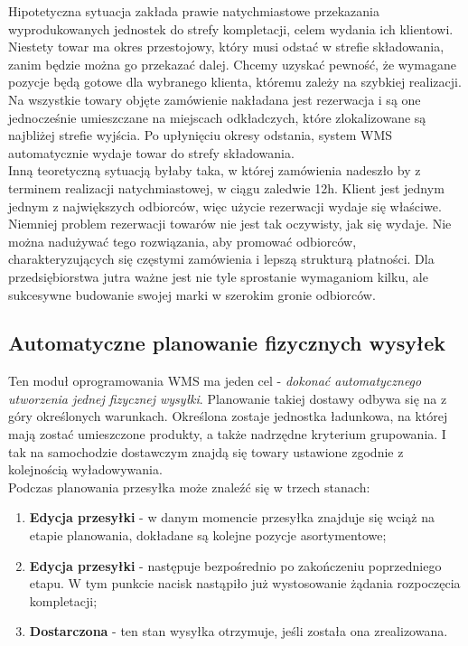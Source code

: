 		Hipotetyczna sytuacja zakłada prawie natychmiastowe przekazania wyprodukowanych jednostek do strefy kompletacji,
		celem wydania ich klientowi. Niestety towar ma okres przestojowy, który musi odstać w strefie składowania, 
		zanim będzie można go przekazać dalej. Chcemy uzyskać pewność, że wymagane pozycje będą gotowe
		dla wybranego klienta, któremu zależy na szybkiej realizacji. Na wszystkie towary objęte zamówienie nakładana
		jest rezerwacja i są one jednocześnie umieszczane na miejscach odkładczych, które zlokalizowane są najbliżej
		strefie wyjścia. Po upłynięciu okresy odstania, system WMS automatycznie wydaje towar do strefy składowania.\\
		Inną teoretyczną sytuacją byłaby taka, w której zamówienia nadeszło by z terminem realizacji natychmiastowej, w ciągu
		zaledwie 12h. Klient jest jednym jednym z największych odbiorców, więc użycie rezerwacji wydaje się właściwe. \\
		
		Niemniej problem rezerwacji towarów nie jest tak oczywisty, jak się wydaje. Nie można nadużywać tego rozwiązania,
		aby promować odbiorców, charakteryzujących się częstymi zamówienia i lepszą strukturą płatności. Dla przedsiębiorstwa
		jutra ważne jest nie tyle sprostanie wymaganiom kilku, ale sukcesywne budowanie swojej marki w szerokim gronie
		odbiorców. 
	\subsection{Automatyczne planowanie fizycznych wysyłek}
		Ten moduł oprogramowania WMS ma jeden cel - \emph{dokonać automatycznego utworzenia jednej fizycznej wysyłki}.
		Planowanie takiej dostawy odbywa się na z góry określonych warunkach. Określona zostaje jednostka ładunkowa, na
		której mają zostać umieszczone produkty, a także nadrzędne kryterium grupowania. I tak na samochodzie dostawczym
		znajdą się towary ustawione zgodnie z kolejnością wyładowywania. \\
		
		Podczas planowania przesyłka może znaleźć się w trzech stanach:
		\begin{enumerate}
			\item \textbf{Edycja przesyłki} - w danym momencie przesyłka znajduje się wciąż na etapie planowania, dokładane
			są kolejne pozycje asortymentowe;
			\item \textbf{Edycja przesyłki} - następuje bezpośrednio po zakończeniu poprzedniego etapu. W tym punkcie nacisk
			nastąpiło już wystosowanie żądania rozpoczęcia kompletacji;
			\item \textbf{Dostarczona} - ten stan wysyłka otrzymuje, jeśli została ona zrealizowana.
		\end{enumerate}

